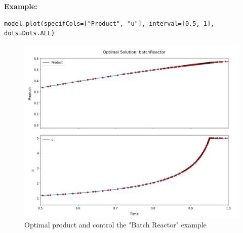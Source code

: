 \documentclass[12pt]{article}
\begin{document}
\begin{mdframed}[backgroundcolor=gray!10, roundcorner=10pt,
		linewidth=1pt]
	\textbf{Example:}	\begin{lstlisting}
model.plot(specifCols=["Product", "u"], interval=[0.5, 1], dots=Dots.ALL)
					\end{lstlisting}
	\begin{figure}[H]
		\centering
		\includegraphics[width=1\textwidth]{images/plotstd.png}
		\caption{Optimal product and control the "Batch Reactor" example}
		\label{fig:batch}
	\end{figure}

\end{mdframed}
\end{document}
